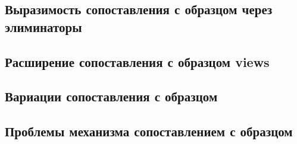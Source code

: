 \documentclass[14pt, a4paper]{extarticle}
\begin{document}
\subsection{Выразимость сопоставления с образцом через элиминаторы}


\subsection{Расширение сопоставления с образцом views}


\subsection{Вариации сопоставления с образцом}


\subsection{Проблемы механизма сопоставлением с образцом}


\newpage


\end{document}
